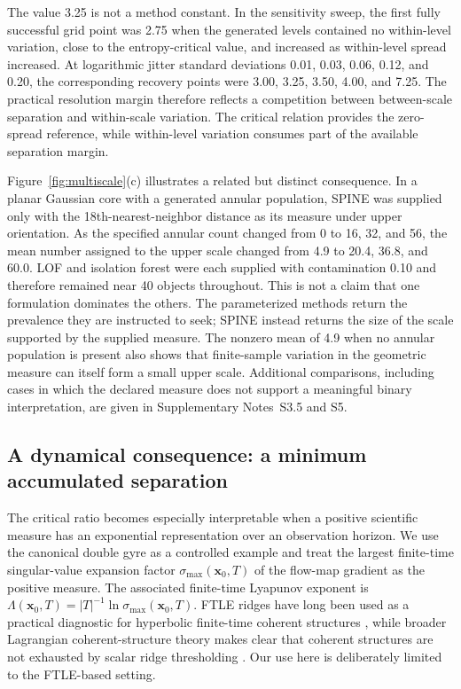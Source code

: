 \documentclass[aip,cha,reprint,superscriptaddress,floatfix]{revtex4-2}
\theoremstyle{definition}
\theoremstyle{remark}
\begin{document}
The value 3.25 is not a method constant. In the sensitivity sweep, the first fully successful grid point was 2.75 when the generated levels contained no within-level variation, close to the entropy-critical value, and increased as within-level spread increased. At logarithmic jitter standard deviations 0.01, 0.03, 0.06, 0.12, and 0.20, the corresponding recovery points were 3.00, 3.25, 3.50, 4.00, and 7.25. The practical resolution margin therefore reflects a competition between between-scale separation and within-scale variation. The critical relation provides the zero-spread reference, while within-level variation consumes part of the available separation margin.

Figure~\ref{fig:multiscale}(c) illustrates a related but distinct consequence. In a planar Gaussian core with a generated annular population, SPINE was supplied only with the 18th-nearest-neighbor distance as its measure under upper orientation. As the specified annular count changed from 0 to 16, 32, and 56, the mean number assigned to the upper scale changed from 4.9 to 20.4, 36.8, and 60.0. LOF \cite{breunig2000} and isolation forest \cite{liu2008} were each supplied with contamination 0.10 and therefore remained near 40 objects throughout. This is not a claim that one formulation dominates the others. The parameterized methods return the prevalence they are instructed to seek; SPINE instead returns the size of the scale supported by the supplied measure. The nonzero mean of 4.9 when no annular population is present also shows that finite-sample variation in the geometric measure can itself form a small upper scale. Additional comparisons, including cases in which the declared measure does not support a meaningful binary interpretation, are given in Supplementary Notes~S3.5 and S5.

\subsection{A dynamical consequence: a minimum accumulated separation}
\label{sec:result-lcs}

The critical ratio becomes especially interpretable when a positive scientific measure has an exponential representation over an observation horizon. We use the canonical double gyre as a controlled example and treat the largest finite-time singular-value expansion factor \(\sigma_{\max}(\bm x_0,T)\) of the flow-map gradient as the positive measure. The associated finite-time Lyapunov exponent is \(\Lambda(\bm x_0,T)=|T|^{-1}\ln\sigma_{\max}(\bm x_0,T)\). FTLE ridges have long been used as a practical diagnostic for hyperbolic finite-time coherent structures \cite{shadden2005}, while broader Lagrangian coherent-structure theory makes clear that coherent structures are not exhausted by scalar ridge thresholding \cite{haller2015}. Our use here is deliberately limited to the FTLE-based setting.
\end{document}
